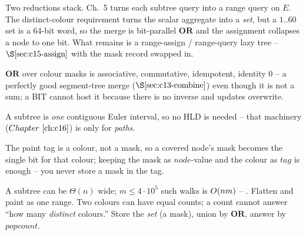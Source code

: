 Two reductions stack.  Ch.~5 turns each subtree query into a range query on \(E\).  The distinct-colour requirement turns the scalar aggregate into a \emph{set}, but a \(1..60\) set is a 64-bit word, so the merge is bit-parallel \(\mathbf{OR}\) and the assignment collapses a node to one bit.  What remains is a range-assign / range-query lazy tree -- \(\secref{c15-assign}\) with the mask record swapped in.

\begin{observation}
\(\mathbf{OR}\) over colour masks is associative, commutative, idempotent, identity \(0\) -- a perfectly good segment-tree merge (\(\secref{c13-combine}\)) even though it is not a sum; a BIT cannot host it because there is no inverse and updates overwrite.
\end{observation}
\begin{observation}
A subtree is \emph{one} contiguous Euler interval, so no HLD is needed -- that machinery (\(\chref{c16}\)) is only for \emph{paths}.
\end{observation}
\begin{observation}
The paint tag is a colour, not a mask, so a covered node's mask becomes the single bit for that colour; keeping the mask as \(\mathit{node}\)-value and the colour as \(\mathit{tag}\) is enough -- you never store a mask in the tag.
\end{observation}

\begin{thinkbox}
{A subtree can be \(\Theta(n)\) wide; \(m\le 4\cdot10^5\) such walks is \(O(nm)\) -- \tle.  Flatten and paint as one range.}
{Two colours can have equal counts; a count cannot answer ``how many \emph{distinct} colours.''  Store the \emph{set} (a mask), union by \(\mathbf{OR}\), answer by \(\mathit{popcount}\).}
\end{thinkbox}

